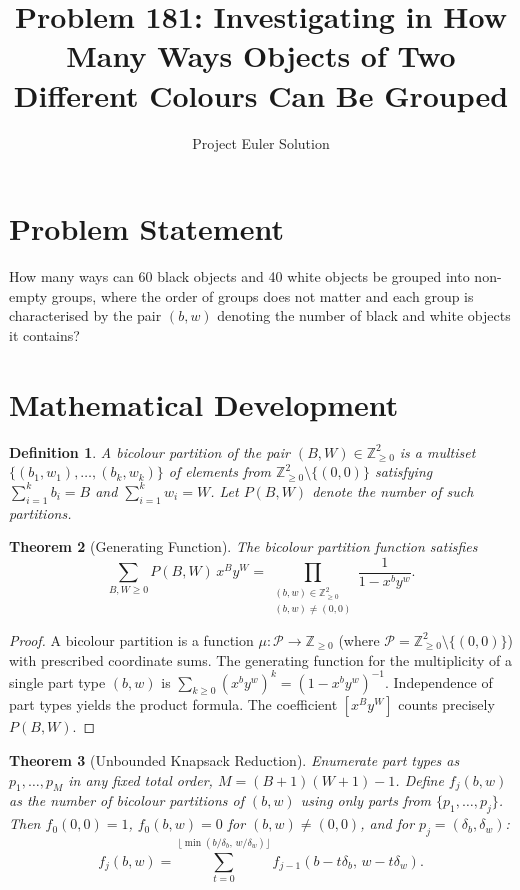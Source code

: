 \documentclass[12pt]{article}
\title{Problem 181: Investigating in How Many Ways Objects of Two Different Colours Can Be Grouped}
\author{Project Euler Solution}
\date{}
\newtheorem{theorem}{Theorem}
\newtheorem{definition}[theorem]{Definition}
\begin{document}
\maketitle

\section{Problem Statement}

How many ways can 60 black objects and 40 white objects be grouped into non-empty groups, where the order of groups does not matter and each group is characterised by the pair $(b, w)$ denoting the number of black and white objects it contains?

\section{Mathematical Development}

\begin{definition}
A \emph{bicolour partition} of the pair $(B, W) \in \mathbb{Z}_{\ge 0}^2$ is a multiset $\{(b_1, w_1), \ldots, (b_k, w_k)\}$ of elements from $\mathbb{Z}_{\ge 0}^2 \setminus \{(0,0)\}$ satisfying $\sum_{i=1}^k b_i = B$ and $\sum_{i=1}^k w_i = W$. Let $P(B, W)$ denote the number of such partitions.
\end{definition}

\begin{theorem}[Generating Function]
The bicolour partition function satisfies
\[
\sum_{B, W \ge 0} P(B, W)\, x^B y^W = \prod_{\substack{(b, w) \in \mathbb{Z}_{\ge 0}^2 \\ (b,w) \neq (0,0)}} \frac{1}{1 - x^b y^w}.
\]
\end{theorem}

\begin{proof}
A bicolour partition is a function $\mu\colon \mathcal{P} \to \mathbb{Z}_{\ge 0}$ (where $\mathcal{P} = \mathbb{Z}_{\ge 0}^2 \setminus \{(0,0)\}$) with prescribed coordinate sums. The generating function for the multiplicity of a single part type $(b,w)$ is $\sum_{k \ge 0} (x^b y^w)^k = (1 - x^b y^w)^{-1}$. Independence of part types yields the product formula. The coefficient $[x^B y^W]$ counts precisely $P(B, W)$.
\end{proof}

\begin{theorem}[Unbounded Knapsack Reduction]
Enumerate part types as $p_1, \ldots, p_M$ in any fixed total order, $M = (B+1)(W+1)-1$. Define $f_j(b,w)$ as the number of bicolour partitions of $(b,w)$ using only parts from $\{p_1, \ldots, p_j\}$. Then $f_0(0,0)=1$, $f_0(b,w)=0$ for $(b,w) \neq (0,0)$, and for $p_j = (\delta_b, \delta_w)$:
\[
f_j(b, w) = \sum_{t=0}^{\lfloor \min(b/\delta_b,\, w/\delta_w) \rfloor} f_{j-1}(b - t\delta_b,\, w - t\delta_w).
\]
\end{theorem}
\end{document}
